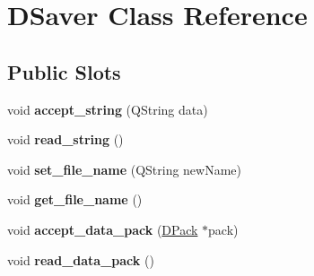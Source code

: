 \hypertarget{class_d_saver}{
\section{DSaver Class Reference}
\label{class_d_saver}
}
\subsection*{Public Slots}
\begin{DoxyCompactItemize}
\item 
\hypertarget{class_d_saver_a31c3409b66085c7465b364cd4f586a57}{
void {\bfseries accept\_\-string} (QString data)}
\label{class_d_saver_a31c3409b66085c7465b364cd4f586a57}

\item 
\hypertarget{class_d_saver_ac9e0c917baf8c95d5f9c670e35eb0374}{
void {\bfseries read\_\-string} ()}
\label{class_d_saver_ac9e0c917baf8c95d5f9c670e35eb0374}

\item 
\hypertarget{class_d_saver_a3120d68e1ce11a75001d492f4c8cf442}{
void {\bfseries set\_\-file\_\-name} (QString newName)}
\label{class_d_saver_a3120d68e1ce11a75001d492f4c8cf442}

\item 
\hypertarget{class_d_saver_a81e2d81811f5b8d08ca587aaae4f4645}{
void {\bfseries get\_\-file\_\-name} ()}
\label{class_d_saver_a81e2d81811f5b8d08ca587aaae4f4645}

\item 
\hypertarget{class_d_saver_a0a6d072bf09ceaec1495e390f963ad93}{
void {\bfseries accept\_\-data\_\-pack} (\hyperlink{struct_d_pack}{DPack} $\ast$pack)}
\label{class_d_saver_a0a6d072bf09ceaec1495e390f963ad93}

\item 
\hypertarget{class_d_saver_ae6a6f60800664717dd004299dadcc757}{
void {\bfseries read\_\-data\_\-pack} ()}
\label{class_d_saver_ae6a6f60800664717dd004299dadcc757}

\end{DoxyCompactItemize}

